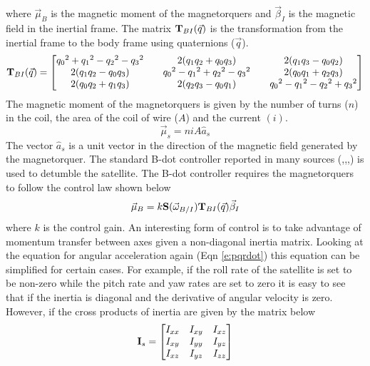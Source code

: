 \documentclass[conf]{new-aiaa}
\begin{document}
where $\vec{\mu}_B$ is the magnetic moment of the magnetorquers and $\vec{\beta}_I$ is the magnetic field in the inertial frame. The matrix ${\bf T}_{BI}(\vec{q})$ is the transformation from the inertial frame to the body frame using quaternions ($\vec{q}$).
\begin{equation}
  {\bf T}_{BI}(\vec{q}) = \begin{bmatrix}
    {q_0}^2 + {q_1}^2 - {q_2}^2 - {q_3}^2 && 2(q_1q_2+q_0q_3) && 2(q_1q_3-q_0q_2)\\
    2(q_1q_2-q_0q_3) && {q_0}^2 - {q_1}^2 + {q_2}^2 - {q_3}^2 && 2(q_0q_1+q_2q_3)\\
    2(q_0q_2+q_1q_3) && 2(q_2q_3-q_0q_1) && {q_0}^2 - {q_1}^2 - {q_2}^2 + {q_3}^2
  \end{bmatrix}
\end{equation}
The magnetic moment of the magnetorquers is given by the number of turns ($n$) in the coil, the area of the coil of wire ($A$) and the current $(i)$.
\begin{equation}
    \vec{\mu}_s = niA\hat{a}_s
\end{equation}
The vector $\hat{a}_s$ is a unit vector in the direction of the magnetic field generated by the magnetorquer.
The standard B-dot controller reported in many sources
(\cite{Leomanni2012},\cite{Lovera2015},\cite{WInstitute},\cite{SanyalDick}) is used to detumble the satellite. The B-dot controller requires the magnetorquers to follow the control law shown below
\begin{equation}\label{e:bdotcompact}
  \vec{\mu}_B = k{\bf S}(\vec{\omega}_{B/I}){\bf T}_{BI}(\vec{q})\vec{\beta}_I
\end{equation}
where $k$ is the control gain. An interesting form of control is to take advantage of momentum
transfer between axes given a non-diagonal inertia matrix. Looking at the equation for angular acceleration again (Eqn \ref{e:pqrdot}) this equation can be simplified for certain cases. For example, if the roll rate of the satellite is set to be non-zero while the pitch rate and yaw rates are set to zero it is easy to see that if the inertia is diagonal and the derivative of angular velocity is zero. However, if the cross products of inertia are given by the matrix below
\begin{equation}
  {\bf I}_s = \begin{bmatrix} I_{xx} & I_{xy} & I_{xz} \\ I_{xy} &
    I_{yy} & I_{yz} \\ I_{xz} & I_{yz} & I_{zz} \end{bmatrix}
\end{equation}
\end{document}
